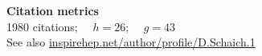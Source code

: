 \renewenvironment{spacelist} {
  \begin{list} {} {
    \setlength{\topsep}{-8 pt}
    \setlength{\itemsep}{5 pt}
    \setlength{\leftmargin}{-1.15 in}
  }
}{
  \end{list}
}

\raggedright

\begin{spacelist}
  \item {\large \bfseries Citation metrics} \\[6 pt]
  1980 citations; \ \ \href{https://en.wikipedia.org/wiki/H-index}{$h = 26$}; \ \ \href{https://en.wikipedia.org/wiki/G-index}{$g = 43$} \\[2 pt]
  See also \href{http://inspirehep.net/author/profile/D.Schaich.1}{inspirehep.net/author/profile/D.Schaich.1} \\[15 pt]


\end{spacelist}
